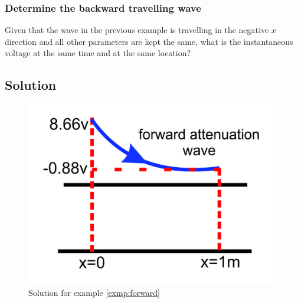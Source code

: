 \begin{exmp}
\subsubsection*{Determine the backward travelling wave}
Given that the wave in the previous example is travelling in the negative ${x}$ direction and all other parameters are kept the same, what is the instantaneous voltage at the same time and at the same location?

\subsection*{Solution}
\begin{figure}[h]
\centering
\includegraphics[scale=0.5]{graphics/Group98}
\caption{Solution for example \ref{exmp:forward}}
\label{fig:group98}
\end{figure}


\end{exmp}
